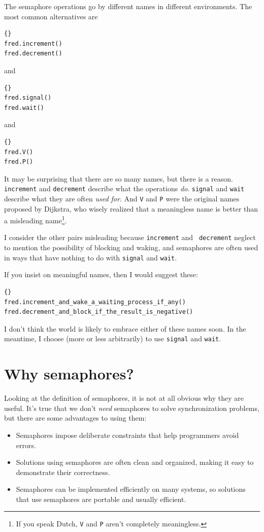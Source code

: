 \documentclass{book}
\begin{document}
The semaphore operations go by different names in different environments.
The most common alternatives are 
%
\begin{lstlisting}[title={Semaphore operations}]{}
fred.increment()
fred.decrement()	
\end{lstlisting}
%
and
%
\begin{lstlisting}[title={Semaphore operations}]{}
fred.signal()
fred.wait()	
\end{lstlisting}
%
and
%
\begin{lstlisting}[title={Semaphore operations}]{}
fred.V()
fred.P()	
\end{lstlisting}
%
It may be surprising that there are so many names, but there is a
reason.  {\tt increment} and {\tt decrement}
describe what the operations {\em do}.  {\tt signal} and {\tt wait}
describe what they are often {\em used for}.  And {\tt V} and {\tt P} were
the original names proposed by Dijkstra, who wisely realized that a
meaningless name is better than a misleading name\footnote{If you speak
Dutch, {\tt V} and {\tt P} aren't completely meaningless.}.

I consider the other pairs misleading because {\tt increment} and {\tt
decrement} neglect to mention the possibility of blocking and waking,
and semaphores are often used in ways that have nothing to do with
{\tt signal} and {\tt wait}.

If you insist on meaningful names, then I would suggest these:

\begin{lstlisting}[title={Semaphore operations}]{}
fred.increment_and_wake_a_waiting_process_if_any()
fred.decrement_and_block_if_the_result_is_negative()	
\end{lstlisting}

I don't think the world is likely to embrace either of these names
soon.  In the meantime, I choose (more or less arbitrarily) to use
{\tt signal} and {\tt wait}.


\section{Why semaphores?}

Looking at the definition of semaphores, it is not at all obvious why
they are useful.  It's true that we don't {\em need} semaphores to
solve synchronization problems, but there are some advantages to using
them:

\begin{itemize}

\item Semaphores impose deliberate constraints that help
programmers avoid errors.

\item Solutions using semaphores are often clean and organized,
making it easy to demonstrate their correctness.

\item Semaphores can be implemented efficiently on many systems,
so solutions that use semaphores are portable and usually
efficient.

\end{itemize}
\end{document}
